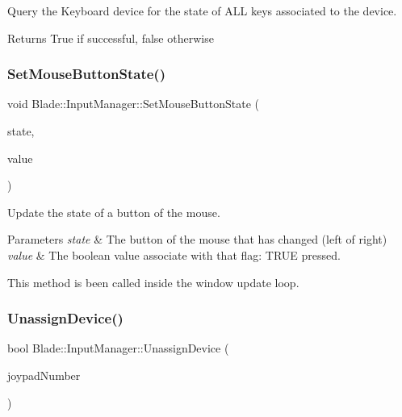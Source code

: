 Query the Keyboard device for the state of A\+LL keys associated to the device. 

\begin{DoxyReturn}{Returns}
True if successful, false otherwise 
\end{DoxyReturn}
\mbox{\label{class_blade_1_1_input_manager_a4670405f916ccabf83465154f3649d17}} 
\subsubsection{\texorpdfstring{Set\+Mouse\+Button\+State()}{SetMouseButtonState()}}
{\footnotesize\ttfamily void Blade\+::\+Input\+Manager\+::\+Set\+Mouse\+Button\+State (\begin{DoxyParamCaption}\item[{Mouse\+Button}]{state,  }\item[{bool}]{value }\end{DoxyParamCaption})}



Update the state of a button of the mouse. 


\begin{DoxyParams}{Parameters}
{\em state} & The button of the mouse that has changed (left of right) \\
\hline
{\em value} & The boolean value associate with that flag\+: T\+R\+UE pressed.\\
\hline
\end{DoxyParams}
This method is been called inside the window update loop. \mbox{\label{class_blade_1_1_input_manager_ab436b8828eb3022334b544f8e201249e}} 
\subsubsection{\texorpdfstring{Unassign\+Device()}{UnassignDevice()}}
{\footnotesize\ttfamily bool Blade\+::\+Input\+Manager\+::\+Unassign\+Device (\begin{DoxyParamCaption}\item[{Joypad\+Number}]{joypad\+Number }\end{DoxyParamCaption})}



